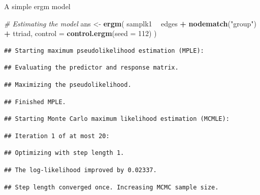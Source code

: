 \documentclass[10pt,ignorenonframetext,handout,aspectratio=169,]{beamer}
\newenvironment{Shaded}{\begin{snugshade}}{\end{snugshade}}
\newcommand{\CommentTok}[1]{\textcolor[rgb]{0.56,0.35,0.01}{\textit{#1}}}
\newcommand{\DataTypeTok}[1]{\textcolor[rgb]{0.13,0.29,0.53}{#1}}
\newcommand{\DecValTok}[1]{\textcolor[rgb]{0.00,0.00,0.81}{#1}}
\newcommand{\KeywordTok}[1]{\textcolor[rgb]{0.13,0.29,0.53}{\textbf{#1}}}
\newcommand{\NormalTok}[1]{#1}
\newcommand{\OperatorTok}[1]{\textcolor[rgb]{0.81,0.36,0.00}{\textbf{#1}}}
\newcommand{\StringTok}[1]{\textcolor[rgb]{0.31,0.60,0.02}{#1}}
\begin{document}
\begin{frame}[fragile]{A simple ergm model}
\protect\hypertarget{a-simple-ergm-model}{}

\footnotesize

\begin{Shaded}
\begin{Highlighting}[]
\CommentTok{# Estimating the model}
\NormalTok{ans <-}\StringTok{ }\KeywordTok{ergm}\NormalTok{(}
\NormalTok{  samplk1 }\OperatorTok{~}\StringTok{ }\NormalTok{edges }\OperatorTok{+}\StringTok{ }\KeywordTok{nodematch}\NormalTok{(}\StringTok{"group"}\NormalTok{) }\OperatorTok{+}\StringTok{ }\NormalTok{ttriad,}
  \DataTypeTok{control =} \KeywordTok{control.ergm}\NormalTok{(}\DataTypeTok{seed =} \DecValTok{112}\NormalTok{)}
\NormalTok{  )}
\end{Highlighting}
\end{Shaded}

\begin{verbatim}
## Starting maximum pseudolikelihood estimation (MPLE):
\end{verbatim}

\begin{verbatim}
## Evaluating the predictor and response matrix.
\end{verbatim}

\begin{verbatim}
## Maximizing the pseudolikelihood.
\end{verbatim}

\begin{verbatim}
## Finished MPLE.
\end{verbatim}

\begin{verbatim}
## Starting Monte Carlo maximum likelihood estimation (MCMLE):
\end{verbatim}

\begin{verbatim}
## Iteration 1 of at most 20:
\end{verbatim}

\begin{verbatim}
## Optimizing with step length 1.
\end{verbatim}

\begin{verbatim}
## The log-likelihood improved by 0.02337.
\end{verbatim}

\begin{verbatim}
## Step length converged once. Increasing MCMC sample size.
\end{verbatim}


\end{frame}
\end{document}
